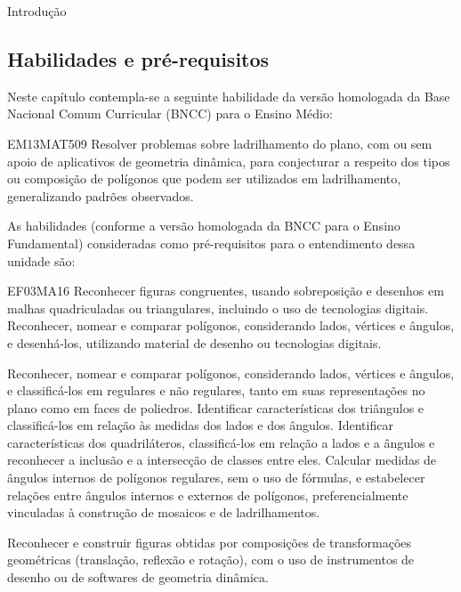\mainmatter

\begin{apresentacao}{Introdução}
\subsection *{Habilidades e pré-requisitos}

Neste capítulo contempla-se a seguinte habilidade da versão homologada da Base Nacional Comum Curricular (BNCC) para o Ensino Médio:

\begin{habilities}{EM13MAT509}
Resolver problemas sobre ladrilhamento do plano, com ou sem apoio de aplicativos de geometria dinâmica, para conjecturar a respeito dos tipos ou composição de polígonos que podem ser utilizados em ladrilhamento, generalizando padrões observados.
\end{habilities}

 
As habilidades (conforme a versão homologada da BNCC para o Ensino Fundamental) consideradas como pré-requisitos para o entendimento dessa unidade são:

\begin{habilities}{EF03MA16}
Reconhecer figuras congruentes, usando sobreposição e desenhos em malhas quadriculadas ou triangulares, incluindo o uso de tecnologias digitais.
 Reconhecer, nomear e comparar polígonos, considerando lados, vértices e ângulos, e desenhá-los, utilizando material de desenho ou tecnologias digitais.

 Reconhecer, nomear e comparar polígonos, considerando lados, vértices e ângulos, e classificá-los em regulares e não regulares, tanto em suas representações no plano como em faces de poliedros.
 Identificar características dos triângulos e classificá-los em relação às medidas dos lados e dos ângulos.
 Identificar características dos quadriláteros, classificá-los em relação a lados e a ângulos e reconhecer a inclusão e a intersecção de classes entre eles.
 Calcular medidas de ângulos internos de polígonos regulares, sem o uso de fórmulas, e estabelecer relações entre ângulos internos e externos de polígonos,
preferencialmente vinculadas à construção de mosaicos e de ladrilhamentos.

 Reconhecer e construir figuras obtidas por composições de transformações geométricas (translação, reflexão e rotação), com o uso de instrumentos de desenho ou de softwares de geometria dinâmica.
\end{habilities}





\end{apresentacao}
